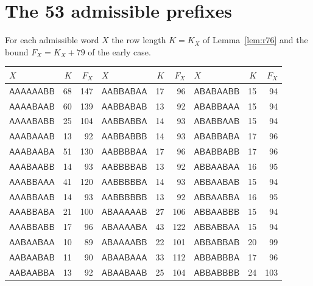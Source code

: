\documentclass[11pt]{amsart}
\theoremstyle{definition}
\theoremstyle{remark}
\newcommand{\cA}{\mathsf{A}}\newcommand{\cB}{\mathsf{B}}\newcommand{\cC}{\mathsf{C}}
\begin{document}
\appendix
\section{The 53 admissible prefixes}\label{app:53}
For each admissible word $X$ the row length $K=K_X$ of Lemma~\ref{lem:r76} and the bound $F_X=K_X+79$ of the early
case.
\begin{center}
{\small
\begin{tabular}{lrr@{\qquad}lrr@{\qquad}lrr}\toprule
$X$ & $K$ & $F_X$ & $X$ & $K$ & $F_X$ & $X$ & $K$ & $F_X$\\\midrule
$\cA\cA\cA\cA\cA\cA\cB\cB$ & 68 & 147 & $\cA\cA\cB\cB\cA\cB\cA\cA$ & 17 & 96 & $\cA\cB\cA\cB\cA\cA\cB\cB$ & 15 & 94\\
$\cA\cA\cA\cA\cB\cA\cA\cB$ & 60 & 139 & $\cA\cA\cB\cB\cA\cB\cA\cB$ & 13 & 92 & $\cA\cB\cA\cB\cB\cA\cA\cA$ & 15 & 94\\
$\cA\cA\cA\cA\cB\cA\cB\cB$ & 25 & 104 & $\cA\cA\cB\cB\cA\cB\cB\cA$ & 14 & 93 & $\cA\cB\cA\cB\cB\cA\cA\cB$ & 15 & 94\\
$\cA\cA\cA\cB\cA\cA\cA\cB$ & 13 & 92 & $\cA\cA\cB\cB\cA\cB\cB\cB$ & 14 & 93 & $\cA\cB\cA\cB\cB\cA\cB\cA$ & 17 & 96\\
$\cA\cA\cA\cB\cA\cA\cB\cA$ & 51 & 130 & $\cA\cA\cB\cB\cB\cB\cA\cA$ & 17 & 96 & $\cA\cB\cA\cB\cB\cA\cB\cB$ & 17 & 96\\
$\cA\cA\cA\cB\cA\cA\cB\cB$ & 14 & 93 & $\cA\cA\cB\cB\cB\cB\cA\cB$ & 13 & 92 & $\cA\cB\cB\cA\cA\cB\cA\cA$ & 16 & 95\\
$\cA\cA\cA\cB\cB\cA\cA\cA$ & 41 & 120 & $\cA\cA\cB\cB\cB\cB\cB\cA$ & 14 & 93 & $\cA\cB\cB\cA\cA\cB\cA\cB$ & 15 & 94\\
$\cA\cA\cA\cB\cB\cA\cA\cB$ & 14 & 93 & $\cA\cA\cB\cB\cB\cB\cB\cB$ & 13 & 92 & $\cA\cB\cB\cA\cA\cB\cB\cA$ & 16 & 95\\
$\cA\cA\cA\cB\cB\cA\cB\cA$ & 21 & 100 & $\cA\cB\cA\cA\cA\cA\cA\cB$ & 27 & 106 & $\cA\cB\cB\cA\cA\cB\cB\cB$ & 15 & 94\\
$\cA\cA\cA\cB\cB\cA\cB\cB$ & 17 & 96 & $\cA\cB\cA\cA\cA\cA\cB\cA$ & 43 & 122 & $\cA\cB\cB\cA\cB\cB\cA\cA$ & 15 & 94\\
$\cA\cA\cB\cA\cA\cB\cA\cA$ & 10 & 89 & $\cA\cB\cA\cA\cA\cA\cB\cB$ & 22 & 101 & $\cA\cB\cB\cA\cB\cB\cA\cB$ & 20 & 99\\
$\cA\cA\cB\cA\cA\cB\cA\cB$ & 11 & 90 & $\cA\cB\cA\cA\cB\cA\cA\cA$ & 33 & 112 & $\cA\cB\cB\cA\cB\cB\cB\cA$ & 17 & 96\\
$\cA\cA\cB\cA\cA\cB\cB\cA$ & 13 & 92 & $\cA\cB\cA\cA\cB\cA\cA\cB$ & 25 & 104 & $\cA\cB\cB\cA\cB\cB\cB\cB$ & 24 & 103\\

\end{tabular}}
\end{center}
\end{document}
